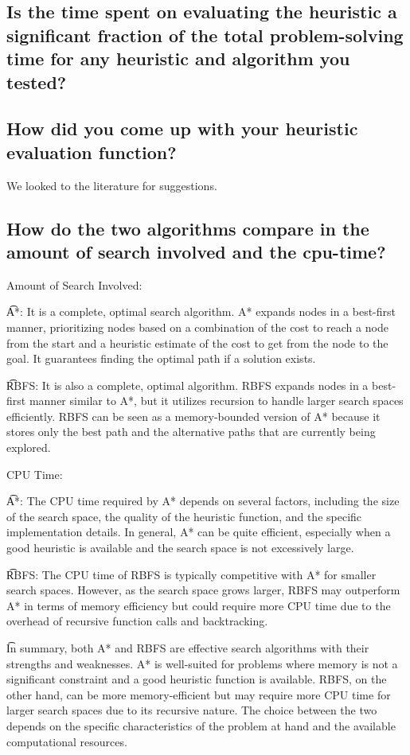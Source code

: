 \documentclass{article}
\begin{document}
\subsection{ Is the time spent on evaluating the heuristic a significant fraction of the total problem-solving time for any heuristic and algorithm you tested?}

\subsection{ How did you come up with your heuristic evaluation function?}

{We looked to the literature for suggestions. }

\subsection{ How do the two algorithms compare in the amount of search involved and the cpu-time?}

{Amount of Search Involved:}

\t A*: It is a complete, optimal search algorithm. A* expands nodes in a best-first manner, prioritizing nodes based on a combination of the cost to reach a node from the start and a heuristic estimate of the cost to get from the node to the goal. It guarantees finding the optimal path if a solution exists.

\t RBFS: It is also a complete, optimal algorithm. RBFS expands nodes in a best-first manner similar to A*, but it utilizes recursion to handle larger search spaces efficiently. RBFS can be seen as a memory-bounded version of A* because it stores only the best path and the alternative paths that are currently being explored.

{CPU Time:}

\t A*: The CPU time required by A* depends on several factors, including the size of the search space, the quality of the heuristic function, and the specific implementation details. In general, A* can be quite efficient, especially when a good heuristic is available and the search space is not excessively large.

\t RBFS: The CPU time of RBFS is typically competitive with A* for smaller search spaces. However, as the search space grows larger, RBFS may outperform A* in terms of memory efficiency but could require more CPU time due to the overhead of recursive function calls and backtracking.

\t In summary, both A* and RBFS are effective search algorithms with their strengths and weaknesses. A* is well-suited for problems where memory is not a significant constraint and a good heuristic function is available. RBFS, on the other hand, can be more memory-efficient but may require more CPU time for larger search spaces due to its recursive nature. The choice between the two depends on the specific characteristics of the problem at hand and the available computational resources.
\end{document}
